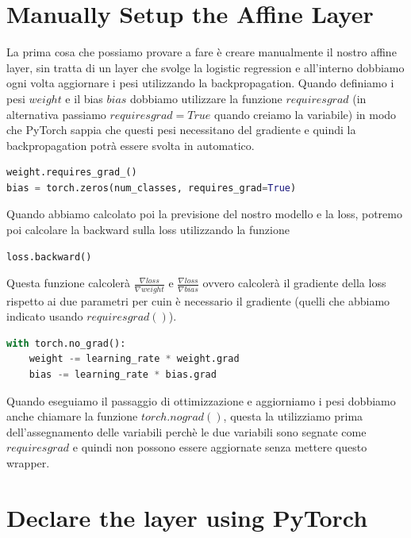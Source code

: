 \documentclass[14pt]{extreport}
\begin{document}
\section{Manually Setup the Affine Layer}

La prima cosa che possiamo provare a fare è creare manualmente il nostro affine layer, sin tratta di un layer che
svolge la logistic regression e all'interno dobbiamo ogni volta aggiornare i pesi utilizzando la backpropagation.
Quando definiamo i pesi $weight$ e il bias $bias$ dobbiamo utilizzare la funzione $requiresgrad$ (in alternativa 
passiamo $requiresgrad = True$ quando creiamo la variabile) in modo che PyTorch sappia che questi pesi
necessitano del gradiente e quindi la backpropagation potrà essere svolta in automatico.

\begin{lstlisting}[language=Python]
weight.requires_grad_()
bias = torch.zeros(num_classes, requires_grad=True)
\end{lstlisting}

Quando abbiamo calcolato poi la previsione del nostro modello e la loss, potremo poi calcolare la 
backward sulla loss utilizzando la funzione 

\begin{lstlisting}[language=Python]
loss.backward()
\end{lstlisting}

Questa funzione calcolerà $\frac{\nabla loss}{\nabla weight}$ e $\frac{\nabla loss}{\nabla bias}$ ovvero 
calcolerà il gradiente della loss rispetto ai due parametri per cuin è necessario il gradiente (quelli che 
abbiamo indicato usando $requiresgrad()$).

\begin{lstlisting}[language=Python]
with torch.no_grad():
	weight -= learning_rate * weight.grad
    bias -= learning_rate * bias.grad
\end{lstlisting}

Quando eseguiamo il passaggio di ottimizzazione e aggiorniamo i pesi dobbiamo anche chiamare la funzione 
$torch.nograd()$, questa la utilizziamo prima dell'assegnamento delle variabili perchè le due variabili 
sono segnate come $requiresgrad$ e quindi non possono essere aggiornate senza mettere questo wrapper.

\section{Declare the layer using PyTorch}
\end{document}
